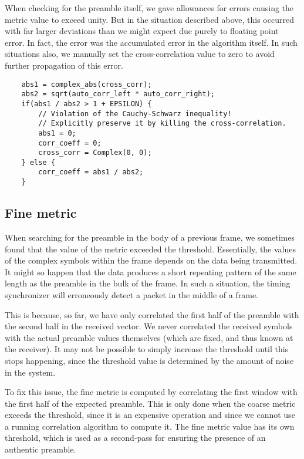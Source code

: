 When checking for the preamble itself, we gave allowances for errors causing
the metric value to exceed unity. But in the situation described above, this
occurred with far larger deviations than we might expect due purely to floating
point error. In fact, the error was the accumulated error in the algorithm
itself. In such situations also, we manually set the cross-correlation value to
zero to avoid further propagation of this error.

\begin{lstlisting}
	abs1 = complex_abs(cross_corr);
	abs2 = sqrt(auto_corr_left * auto_corr_right);
	if(abs1 / abs2 > 1 + EPSILON) {
		// Violation of the Cauchy-Schwarz inequality!
		// Explicitly preserve it by killing the cross-correlation.
		abs1 = 0;
		corr_coeff = 0;
		cross_corr = Complex(0, 0);
	} else {
		corr_coeff = abs1 / abs2;
	}
\end{lstlisting}

\subsection{Fine metric}
\label{subsec:fine-metric}

When searching for the preamble in the body of a previous frame, we sometimes
found that the value of the metric exceeded the threshold. Essentially, the
values of the complex symbols within the frame depends on the data being
transmitted. It might so happen that the data produces a short repeating
pattern of the same length as the preamble in the bulk of the frame. In such a
situation, the timing synchronizer will erroneously detect a packet in the
middle of a frame.

This is because, so far, we have only correlated the first half of the preamble
with the second half in the received vector. We never correlated the received
symbols with the actual preamble values themselves (which are fixed, and thus
known at the receiver). It may not be possible to simply increase the threshold
until this stops happening, since the threshold value is determined by the
amount of noise in the system.

To fix this issue, the fine metric is computed by correlating the first window
with the first half of the expected preamble. This is only done when the coarse
metric exceeds the threshold, since it is an expensive operation and since we
cannot use a running correlation algorithm to compute it. The fine metric value
has its own threshold, which is used as a second-pass for ensuring the presence
of an authentic preamble.

